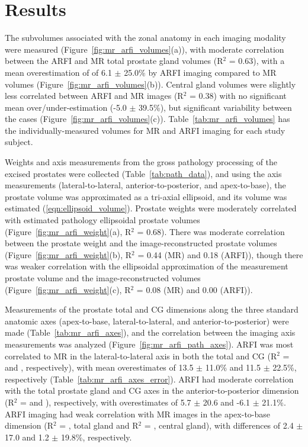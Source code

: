 \section{Results}\label{sect:results}
The subvolumes associated with the zonal anatomy in each imaging modality were
measured (Figure~\ref{fig:mr_arfi_volumes}(a)), with moderate correlation
between the ARFI and MR total prostate gland volumes (R$^2$ = 0.63), with a
mean overestimation of of 6.1 $\pm$ 25.0\% by ARFI imaging compared to MR
volumes (Figure~\ref{fig:mr_arfi_volumes}(b)).  Central gland volumes were
slightly less correlated between ARFI and MR images (R$^2$ = 0.38) with no
significant mean over/under-estimation (-5.0 $\pm$ 39.5\%), but significant
variability between the cases (Figure~\ref{fig:mr_arfi_volumes}(c)).
Table~\ref{tab:mr_arfi_volumes} has the individually-measured volumes for MR
and ARFI imaging for each study subject.



Weights and axis measurements from the gross pathology processing of the
excised prostates were collected (Table~\ref{tab:path_data}), and using the
axis measurements (lateral-to-lateral, anterior-to-posterior, and
apex-to-base), the prostate volume was approximated as a tri-axial ellipsoid,
and its volume was estimated (\ref{eqn:ellipsoid_volume}).  Prostate weights
were moderately correlated with estimated pathology ellipsoidal prostate
volumes (Figure~\ref{fig:mr_arfi_weight}(a), R$^2$ = 0.68).  There was moderate
correlation between the prostate weight and the image-reconstructed prostate
volumes (Figure~\ref{fig:mr_arfi_weight}(b), R$^2$ = 0.44 (MR) and 0.18
(ARFI)), though there was weaker correlation with the ellipsoidal approximation
of the measurement prostate volume and the image-reconstructed volumes
(Figure~\ref{fig:mr_arfi_weight}(c), R$^2$ = 0.08 (MR) and 0.00 (ARFI)).  



Measurements of the prostate total and CG dimensions along the three standard
anatomic axes (apex-to-base, lateral-to-lateral, and anterior-to-posterior)
were made (Table~\ref{tab:mr_arfi_axes}), and the correlation between the
imaging axis measurements was analyzed (Figure~\ref{fig:mr_arfi_path_axes}).
ARFI was most correlated to MR in the lateral-to-lateral axis in both the total
and CG (R$^2$ = \totalLatLatRsq and \centralLatLatRsq, respectively), with mean overestimates of 13.5
$\pm$ 11.0\% and 11.5 $\pm$ 22.5\%, respectively
(Table~\ref{tab:mr_arfi_axes_error}).  ARFI had moderate correlation with the
total prostate gland and CG axes in the anterior-to-posterior dimension (R$^2$
= \totalAntPostRsq and \centralAntPostRsq), respectively, with overestimates of 5.7 $\pm$ 20.6
and -6.1 $\pm$ 21.1\%.  ARFI imaging had weak correlation with MR images in the
apex-to-base dimension (R$^2$ = \totalApexBaseRsq, total gland and R$^2$ = \centralApexBaseRsq, central gland), with
differences of 2.4 $\pm$ 17.0 and 1.2 $\pm$ 19.8\%, respectively.





%

%

%
